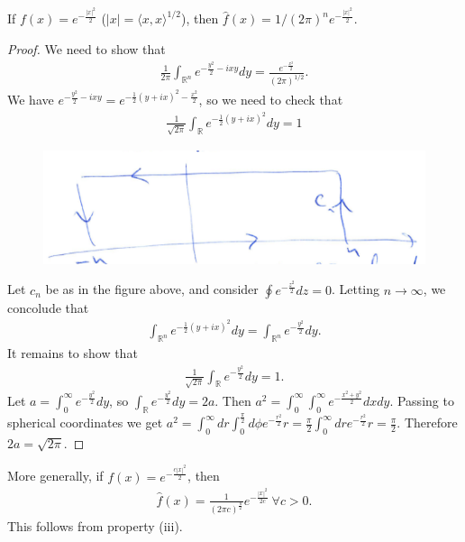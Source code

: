 If \(f(x) = e^{-\frac{|x|^2}{2}}\) (\(|x|=\langle x,x\rangle^{1/2}\)), then \(\hat{f}(x) = 1/(2\pi)^n e^{-\frac{|x|^2}{2}}\).
\ifdetailed
\begin{proof}
    We need to show that 
    \begin{align*}
        \frac{1}{2\pi}\int_{\mathbb{R}^n} e^{-\frac{y^2}{2}-ixy}dy = \frac{e^{-\frac{x^2}{2}}}{(2\pi)^{1/2}}.
    \end{align*}
    We have \(e^{-\frac{y^2}{2}-ixy} = e^{-\frac{1}{2}(y+ix)^2-\frac{x^2}{2}}\), so we need to check that
    \begin{align*}
        \frac{1}{\sqrt{2\pi}} \int_{\mathbb{R}}e^{-\frac{1}{2}(y+ix)^2}dy = 1
    \end{align*}
    \begin{figure}[H]
        \centering
        \includegraphics[scale=0.5]{Figs/for_proof_fourieridentity.png}
    \end{figure}
    Let \(c_n\) be as in the figure above, and consider \(\oint e^{-\frac{z^2}{2}}dz = 0\). Letting \(n\rightarrow\infty \), we concolude that 
    \begin{align*}
        \int_{\mathbb{R}^n}e^{-\frac{1}{2}(y+ix)^2}dy = \int_{\mathbb{R}^n} e^{-\frac{y^2}{2}}dy.
    \end{align*}
    It remains to show that 
    \begin{align*}
        \frac{1}{\sqrt{2\pi}}\int_{\mathbb{R}} e^{-\frac{y^2}{2}}dy = 1.
    \end{align*}
    Let \(a= \int_{0}^{\infty}e^{-\frac{y^2}{2}}dy\), so \(\int_{\mathbb{R}} e^{-\frac{y^2}{2}}dy = 2a\). Then \(a^2 = \int_{0}^{\infty}\int_{0}^{\infty}e^{-\frac{x^2+y^2}{2}}dxdy\). Passing to spherical coordinates we get \(a^2= \int_{0}^{\infty}dr\int_{0}^{\frac{\pi}{2 }}d\phi e^{-\frac{r^2}{2}}r = \frac{\pi}{2}\int_{0}^{\infty}dr e^{-\frac{r^2}{2}}r = \frac{\pi}{2}\). Therefore \(2a = \sqrt{2\pi}\).
\end{proof}
\fi 
More generally, if \(f(x) = e^{-\frac{c|x|^2}{2}}\), then 
\begin{align*}
    \hat{f}(x) = \frac{1}{(2\pi c)^{\frac{u}{2}}} e^{-\frac{|x|^2}{2c}} \ \forall c>0.
\end{align*}
This follows from property (iii).

